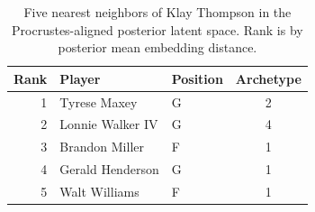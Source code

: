 \begin{table}[htbp]
  \centering\small
  \begin{tabular}{rllc}
    \toprule
    Rank & Player & Position & Archetype \\
    \midrule
    1 & Tyrese Maxey & G & 2 \\
    2 & Lonnie Walker IV & G & 4 \\
    3 & Brandon Miller & F & 1 \\
    4 & Gerald Henderson & G & 1 \\
    5 & Walt Williams & F & 1 \\
    \bottomrule
  \end{tabular}
  \caption{Five nearest neighbors of Klay Thompson in the Procrustes-aligned posterior latent space. Rank is by posterior mean embedding distance.}
  \label{tab:Klay_Thompson_neighbors}
\end{table}

